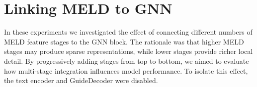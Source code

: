 \documentclass[a4paper,12pt]{article}
\begin{document}





















\clearpage
\section{Linking MELD to GNN}
In these experiments we investigated the effect of connecting different numbers of MELD feature stages to the GNN block. The rationale was that higher MELD stages may produce sparse representations, while lower stages provide richer local detail. By progressively adding stages from top to bottom, we aimed to evaluate how multi-stage integration influences model performance. To isolate this effect, the text encoder and GuideDecoder were disabled.
\end{document}
